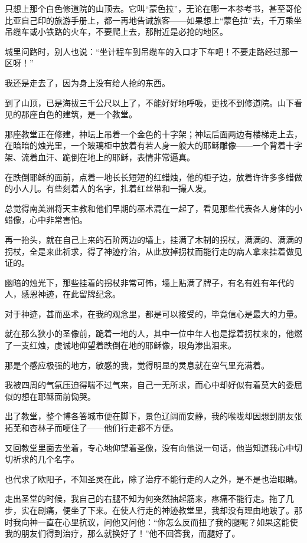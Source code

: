 \par 只想上那个白色修道院的山顶去。它叫“蒙色拉”，无论在哪一本参考书，甚至哥伦比亚自己印的旅游手册上，都一再地告诫旅客——如果想上“蒙色拉”去，千万乘坐吊缆车或小铁路的火车，不要爬上去，那附近是必抢的地区。
\par 城里问路时，别人也说：“坐计程车到吊缆车的入口才下车吧！不要走路经过那一区呀！”
\par 我还是走去了，因为身上没有给人抢的东西。
\par 到了山顶，已是海拔三千公尺以上了，不能好好地呼吸，更找不到修道院。山下看见的那座白色的建筑，是一个教堂。
\par 那座教堂正在修建，神坛上吊着一个金色的十字架；神坛后面两边有楼梯走上去，在暗暗的烛光里，一个玻璃柜中放着有若人身一般大的耶稣雕像——一个背着十字架、流着血汗、跪倒在地上的耶稣，表情非常逼真。
\par 在跌倒耶稣的面前，点着一地长长短短的红蜡烛，他的柜子边，放着许许多多蜡做的小人儿。有些刻着人的名字，扎着红丝带和一撮人发。
\par 总觉得南美洲将天主教和他们早期的巫术混在一起了，看见那些代表各人身体的小蜡像，心中非常害怕。
\par 再一抬头，就在自己上来的石阶两边的墙上，挂满了木制的拐杖，满满的、满满的拐杖，全是来此祈求，得了神迹疗治，从此放掉拐杖而能行走的病人拿来挂着做见证的。
\par 幽暗的烛光下，那些挂着的拐杖非常可怖，墙上贴满了牌子，有名有姓有年代的人，感恩神迹，在此留牌纪念。
\par 对于神迹，甚而巫术，在我的观念里，都是可以接受的，毕竟信心是最大的力量。
\par 就在那么狭小的圣像前，跪着一地的人，其中一位中年人也是撑着拐杖来的，他燃了一支红烛，虔诚地仰望着跌倒在地的耶稣像，眼角渗出泪来。
\par 那是个感应极强的地方，敏感的我，觉得明显的灵息就在空气里充满着。
\par 我被四周的气氛压迫得喘不过气来，自己一无所求，而心中却好似有着莫大的委屈似的想在耶稣面前恸哭。
\par 出了教堂，整个博各答城市便在脚下，景色辽阔而安静，我的喉咙却因想到朋友张拓芜和杏林子而哽住了——他们行走都不方便。
\par 又回教堂里面去坐着，专心地仰望着圣像，没有向他说一句话，他当知道我心中切切祈求的几个名字。
\par 也代求了欧阳子，不知圣灵在此，除了治疗不能行走的人之外，是不是也治眼睛。
\par 走出圣堂的时候，我自己的右腿不知为何突然抽起筋来，疼痛不能行走。拖了几步，实在剧痛，便坐了下来。在使人行走的神迹教堂里，我却没有理由地跛了。那时我向神一直在心里抗议，问他又问他：“你怎么反而扭了我的腿呢？如果这能使我的朋友们得到治疗，那么就换好了！”他不回答我，而腿好了。

